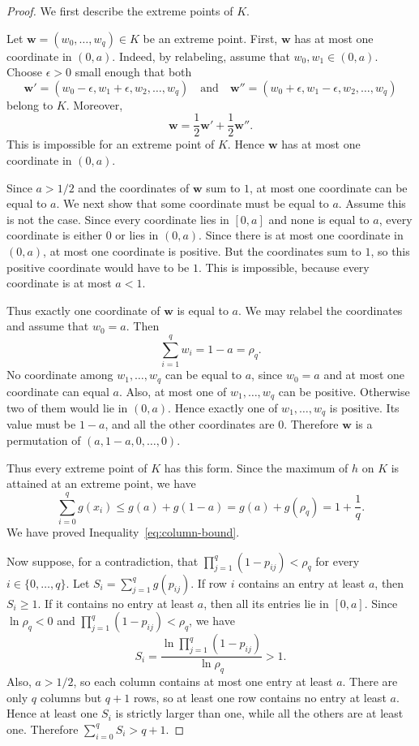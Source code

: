 \documentclass[12pt]{article}
\numberwithin{equation}{section}
\theoremstyle{definition}
\begin{document}
\begin{proof}
We first describe the extreme points of $K$.

Let $\mathbf{w} = (w_0,\ldots,w_q) \in K$ be an extreme point. First, $\mathbf{w}$
has at most one coordinate in $(0,a)$. Indeed, by relabeling, assume that
$w_0,w_1 \in (0,a)$. Choose $\epsilon > 0$ small enough that both
\[
\mathbf{w}' = (w_0 - \epsilon,w_1 + \epsilon,w_2,\ldots,w_q)
\quad\text{and}\quad
\mathbf{w}'' = (w_0 + \epsilon,w_1 - \epsilon,w_2,\ldots,w_q)
\]
belong to $K$. Moreover,
\[
\mathbf{w} = \frac{1}{2}\mathbf{w}' + \frac{1}{2}\mathbf{w}''.
\]
This is impossible for an extreme point of $K$. Hence $\mathbf{w}$ has at most
one coordinate in $(0,a)$.

Since $a > 1/2$ and the coordinates of $\mathbf{w}$ sum to $1$, at most one
coordinate can be equal to $a$. We next show that some coordinate must be
equal to $a$. Assume this is not the case. Since every coordinate lies in
$[0,a]$ and none is equal to $a$, every coordinate is either $0$ or lies in
$(0,a)$. Since there is at most one coordinate in $(0,a)$, at most one
coordinate is positive. But the coordinates sum to $1$, so this positive
coordinate would have to be $1$. This is impossible, because every coordinate
is at most $a < 1$.

Thus exactly one coordinate of $\mathbf{w}$ is equal to $a$. We may relabel
the coordinates and assume that $w_0 = a$. Then
\[
\sum_{i = 1}^q w_i = 1 - a = \rho_q.
\]
No coordinate among $w_1,\ldots,w_q$ can be equal to $a$, since $w_0 = a$
and at most one coordinate can equal $a$. Also, at most one of
$w_1,\ldots,w_q$ can be positive. Otherwise two of them would lie in
$(0,a)$. Hence exactly one of $w_1,\ldots,w_q$ is positive. Its value must
be $1 - a$, and all the other coordinates are $0$. Therefore
$\mathbf{w}$ is a permutation of $(a,1 - a,0,\ldots,0)$.

Thus every extreme point of $K$ has this form. Since the maximum of $h$ on
$K$ is attained at an extreme point, we have
\[
 \sum_{i = 0}^q g(x_i)
 \leq g(a) + g(1 - a)
 = g(a) + g(\rho_q)
 = 1 + \frac{1}{q}.
\]
We have proved Inequality~\eqref{eq:column-bound}.

\medskip

Now suppose, for a contradiction, that
$\prod_{j = 1}^q(1 - p_{ij}) < \rho_q$ for every $i \in \{0,\ldots,q\}$. Let
$S_i = \sum_{j = 1}^q g(p_{ij})$. If row $i$ contains an entry at least $a$, then
$S_i \geq 1$. If it contains no entry at least $a$, then all its entries lie
in $[0,a]$. Since $\ln\rho_q < 0$ and
$\prod_{j = 1}^q(1 - p_{ij}) < \rho_q$, we have
\[
        S_i = \frac{\ln\prod_{j = 1}^q(1 - p_{ij})}{\ln\rho_q} > 1.
\]
Also, $a > 1/2$, so each column contains at most one entry at least $a$. There are only
$q$ columns but $q + 1$ rows, so at least one row contains no entry at
least $a$. Hence at least one $S_i$ is strictly larger than one, while all
the others are at least one. Therefore $\sum_{i = 0}^q S_i > q + 1$.


\end{proof}
\end{document}
